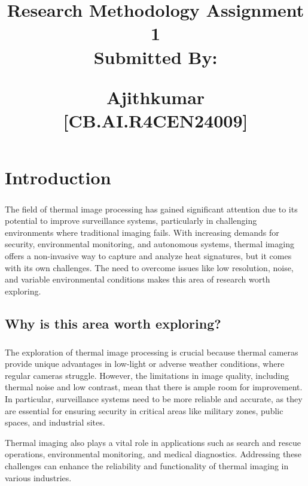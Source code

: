 \documentclass[11pt,a4paper]{report}
\title{
\vspace{-3.4cm}
\begin{center}
{\Large \textbf{Research Methodology Assignment 1}}\\
\vspace{0.5cm}
Submitted By:\\
\vspace{0.2cm}
\begin{large}
{\textbf{Ajithkumar}}\\
\textbf{[CB.AI.R4CEN24009]}\\
\end{large}
\end{center}
}
\begin{document}
\maketitle
\chapter{Introduction}

\paragraph{ } The field of thermal image processing has gained significant attention due to its potential to improve surveillance systems, particularly in challenging environments where traditional imaging fails. With increasing demands for security, environmental monitoring, and autonomous systems, thermal imaging offers a non-invasive way to capture and analyze heat signatures, but it comes with its own challenges. The need to overcome issues like low resolution, noise, and variable environmental conditions makes this area of research worth exploring.

\section{Why is this area worth exploring?}

\paragraph{ } The exploration of thermal image processing is crucial because thermal cameras provide unique advantages in low-light or adverse weather conditions, where regular cameras struggle. However, the limitations in image quality, including thermal noise and low contrast, mean that there is ample room for improvement. In particular, surveillance systems need to be more reliable and accurate, as they are essential for ensuring security in critical areas like military zones, public spaces, and industrial sites.

Thermal imaging also plays a vital role in applications such as search and rescue operations, environmental monitoring, and medical diagnostics. Addressing these challenges can enhance the reliability and functionality of thermal imaging in various industries.
\end{document}
